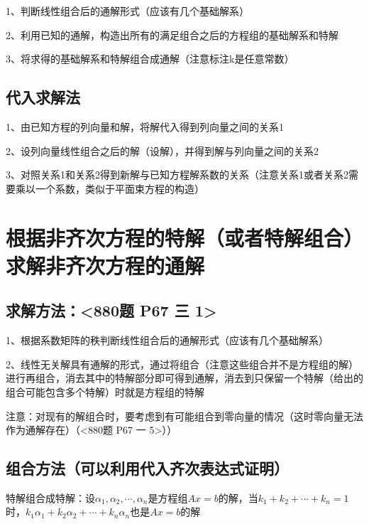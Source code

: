 1、判断线性组合后的通解形式（应该有几个基础解系）

2、利用已知的通解，构造出所有的满足组合之后的方程组的基础解系和特解

3、将求得的基础解系和特解组合成通解（注意标注k是任意常数）



\subsection{代入求解法}

1、由已知方程的列向量和解，将解代入得到列向量之间的关系1

2、设列向量线性组合之后的解（设解），并得到解与列向量之间的关系2

3、对照关系1和关系2得到新解与已知方程解系数的关系（注意关系1或者关系2需要乘以一个系数，类似于平面束方程的构造）

\section{根据非齐次方程的特解（或者特解组合）求解非齐次方程的通解}



\subsection{求解方法：<880题 P67 三 1>}

1、根据系数矩阵的秩判断线性组合后的通解形式（应该有几个基础解系）

2、线性无关解具有通解的形式，通过将组合（注意这些组合并不是方程组的解）进行再组合，消去其中的特解部分即可得到通解，消去到只保留一个特解（给出的组合可能包含多个特解）时就是方程组的特解

注意：对现有的解组合时，要考虑到有可能组合到零向量的情况（这时零向量无法作为通解存在）（<880题 P67 一 5>））



\subsection{组合方法（可以利用代入齐次表达式证明）}

特解组合成特解：设$\alpha_1,\alpha_2,\cdots,\alpha_n$是方程组$Ax=b$的解，当$k_1+k_2+\cdots+k_n=1$时，$k_1\alpha_1+k_2\alpha_2+\cdots+k_n\alpha_n $也是$Ax=b$的解

